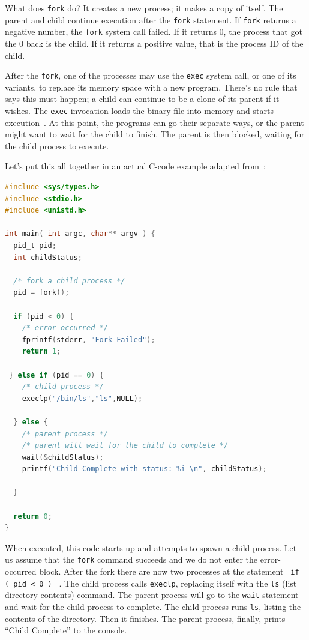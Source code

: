 What does \texttt{fork} do? It creates a new process; it makes a copy of itself. The parent and child continue execution after the \texttt{fork} statement. If \texttt{fork} returns a negative number, the \texttt{fork} system call failed. If it returns 0, the process that got the 0 back is the child. If it returns a positive value, that is the process ID of the child.

After the \texttt{fork}, one of the processes may use the \texttt{exec} system call, or one of its variants, to replace its memory space with a new program. There's no rule that says this must happen; a child can continue to be a clone of its parent if it wishes. The \texttt{exec} invocation loads the binary file into memory and starts execution~\cite{osc}. At this point, the programs can go their separate ways, or the parent might want to wait for the child to finish. The parent is then blocked, waiting for the child process to execute.

Let's put this all together in an actual C-code example adapted from~\cite{osc}:

\begin{lstlisting}[language=C]
#include <sys/types.h>
#include <stdio.h> 
#include <unistd.h>

int main( int argc, char** argv ) {
  pid_t pid;
  int childStatus;

  /* fork a child process */
  pid = fork();
  
  if (pid < 0) { 
    /* error occurred */ 
    fprintf(stderr, "Fork Failed"); 
    return 1;
  
 } else if (pid == 0) {    
    /* child process */
    execlp("/bin/ls","ls",NULL);
    
  } else {    
    /* parent process */
    /* parent will wait for the child to complete */
    wait(&childStatus);
    printf("Child Complete with status: %i \n", childStatus);
    
  }
    
  return 0;
}
\end{lstlisting}

When executed, this code starts up and attempts to spawn a child process. Let us assume that the \texttt{fork} command succeeds and we do not enter the error-occurred block.  After the fork there are now two processes at the statement \texttt{ if ( pid < 0 ) } . The child process calls \texttt{execlp}, replacing itself with the \texttt{ls} (list directory contents) command. The parent process will go to the \texttt{wait} statement and wait for the child process to complete. The child process runs \texttt{ls}, listing the contents of the directory. Then it finishes. The parent process, finally, prints ``Child Complete'' to the console.

